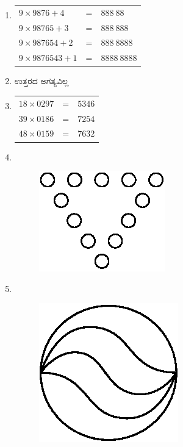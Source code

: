 \begin{enumerate}
\item 
\begin{tabular}[t]{l@{\;}l@{\;}l}
$9\times 9876 + 4$ & = & $888~88$\\
$9\times 98765 + 3$ & = & $888~888$\\
$9\times 987654 + 2$ & = & $888~8888$\\
$9\times 9876543 + 1$ & = & $8888~8888$\\
\end{tabular}

\item ಉತ್ತರದ ಅಗತ್ಯವಿಲ್ಲ 

\item 
\begin{tabular}[t]{l@{\;}l@{\;}l}
$18\times 0297$ & = & $5346$\\
$39\times 0186$ & = & $7254$\\
$48\times 0159$ & = & $7632$
\end{tabular}

\item 
~

\begin{figure}[H]
\centering
\includegraphics{images/chap10/ans17.eps}
\end{figure}

\item 
~

\begin{figure}[H]
\centering
\includegraphics{images/chap10/ans18.eps}
\end{figure}


\end{enumerate}
